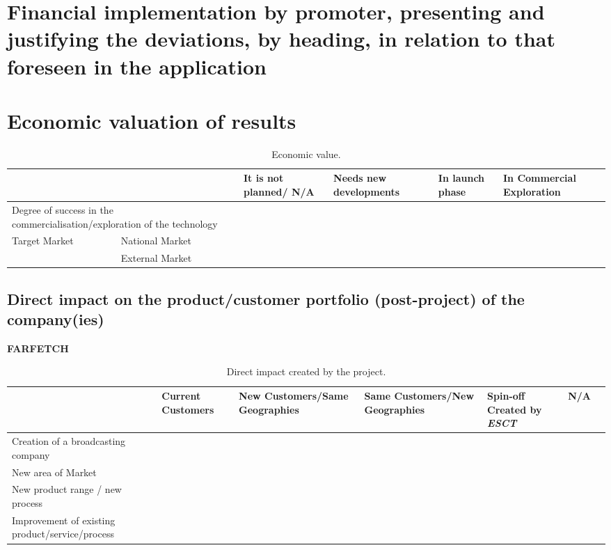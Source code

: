 \documentclass{ani}
\begin{document}
\cite{sigfridsson}

\chapter{Financial implementation by promoter, presenting and justifying the deviations, by heading, in relation to that foreseen in the application}
\lipsum[30-32]

\chapter{Economic valuation of results}
\begin{table}[!htp]
  \centering
  \scriptsize
  
  \begin{tabular}{ll|p{}p{}p{}p{}}
    \hline\hline
    & & \textbf{It is not planned/ N/A} & \textbf{Needs new developments} & \textbf{In launch phase} & \textbf{In Commercial Exploration}  \\ \hline
    \multicolumn{2}{p{0.4\textwidth}|}{Degree of success in the commercialisation/exploration of the technology} & & & &\\ \hline
    \multirow{2}{*}{Target Market} & National Market & & & & \\ \cline{2-6}
                                   & External Market & & & & \\ \hline
    \hline
  \end{tabular}
  \caption{Economic value.} 
\end{table}

\section{Direct impact on the product/customer portfolio (post-project) of the company(ies)}

\textbf{FARFETCH}

\begin{table}[!htp]
  \centering
  \scriptsize
  
  \begin{tabular}{p{}|p{}p{}p{}p{}p{}p{}}
    \hline\hline
                         & \textbf{Current Customers} & \textbf{New Customers/Same Geographies} & \textbf{Same Customers/New Geographies} & \textbf{Spin-off Created by \emph{ESCT}} & \textbf{N/A}\\ \hline
    Creation of a broadcasting company & & & & &\\ \hline
    New area of Market                 & & & & & \\ \hline
    New product range / new process    & & & & & \\ \hline
    Improvement of existing product/service/process & & & & & \\ \hline
    \hline
  \end{tabular}
  \caption{Direct impact created by the project.} 
\end{table}
\end{document}
